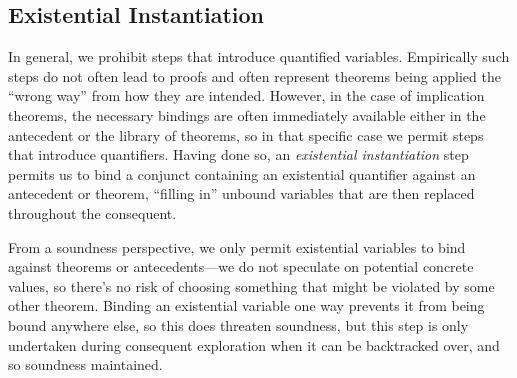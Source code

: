 	\subsection{Existential Instantiation\label{sec:existentialInstantiation}}
In general, we prohibit steps that introduce quantified variables.  Empirically such steps do not often lead to proofs and often represent theorems being applied the ``wrong way'' from how they are intended.  However, in the case of implication theorems, the necessary bindings are often immediately available either in the antecedent or the library of theorems, so in that specific case we permit steps that introduce quantifiers.  Having done so, an \emph{existential instantiation} step permits us to bind a conjunct containing an existential quantifier against an antecedent or theorem, ``filling in'' unbound variables that are then replaced throughout the consequent.

From a soundness perspective, we only permit existential variables to bind against theorems or antecedents---we do not speculate on potential concrete values, so there's no risk of choosing something that might be violated by some other theorem.  Binding an existential variable one way prevents it from being bound anywhere else, so this does threaten soundness, but this step is only undertaken during consequent exploration when it can be backtracked over, and so soundness maintained.
